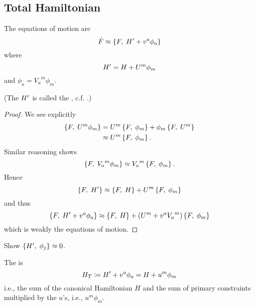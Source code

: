 \subsection{Total Hamiltonian}
\begin{theorem}\label{thm:constrained:total-hamiltonian-eqns-of-motion}
The equations of motion are
\begin{equation}
\dot{F}\approx\left\{F,\;H'+v^{a}\phi_{a}\right\}
\end{equation}
where
\begin{equation}
  H' = H + U^{m}\phi_{m}
\end{equation}
and $\phi_{a} = {V_{a}}^{m}\phi_{m}$.
\end{theorem}
(The $H'$ is called the , c.f. .)
\begin{proof}
We see explicitly
\begin{equation}
  \begin{split}
\left\{F,\;U^{m}\phi_{m}\right\}&=U^{m}\left\{F,\;\phi_{m}\right\}
  + \phi_{m}\left\{F,\;U^{m}\right\}\\
&\approx U^{m}\left\{F,\;\phi_{m}\right\}.
  \end{split}
\end{equation}
Similar reasoning shows
\begin{equation}
  \left\{F,\;{V_{a}}^{m}\phi_{m}\right\}\approx {V_{a}}^{m}\left\{F,\;\phi_{m}\right\}.
\end{equation}
Hence
\begin{equation}
  \left\{F,\;H'\right\}\approx\left\{F,\;H\right\}+U^{m}\left\{F,\;\phi_{m}\right\}
\end{equation}
and thus
\begin{equation}
\left\{F,\;H'+v^{a}\phi_{a}\right\}\approx\left\{F,\;H\right\}+(U^{m}+v^{a}{V_{a}}^{m})\left\{F,\;\phi_{m}\right\}  
\end{equation}
which is weakly the equations of motion.
\end{proof}
\begin{xca}
Show $\left\{H',\;\phi_{j}\right\}\approx0$.
\end{xca}
\begin{definition}\label{defn:total-hamiltonian}
  The  is
  \begin{equation}
    H_{T} \coloneqq H' + v^{a}\phi_{a} = H + u^{m}\phi_{m}
  \end{equation}
  i.e., the sum of the canonical Hamiltonian $H$ and the sum of primary
  constraints multiplied by the $u$'s, i.e., $u^{m}\phi_{m}$.
  \end{definition}
